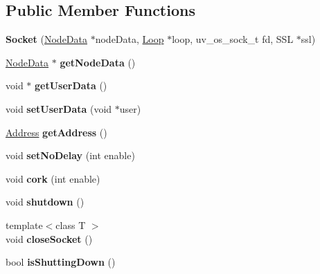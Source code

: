 \subsection*{Public Member Functions}
\begin{DoxyCompactItemize}
\item 
\mbox{\label{structu_s_1_1_socket_af0382e650ead4694c8114c4b0b56743b}} 
{\bfseries Socket} (\mbox{\hyperlink{structu_s_1_1_node_data}{Node\+Data}} $\ast$node\+Data, \mbox{\hyperlink{struct_loop}{Loop}} $\ast$loop, uv\+\_\+os\+\_\+sock\+\_\+t fd, S\+SL $\ast$ssl)
\item 
\mbox{\label{structu_s_1_1_socket_ae41d00dd8888a37bf235d6e4c4dd3bef}} 
\mbox{\hyperlink{structu_s_1_1_node_data}{Node\+Data}} $\ast$ {\bfseries get\+Node\+Data} ()
\item 
\mbox{\label{structu_s_1_1_socket_ab86ba43740c50f1a969917ee1105e55f}} 
void $\ast$ {\bfseries get\+User\+Data} ()
\item 
\mbox{\label{structu_s_1_1_socket_a81edd7ed05f455899a09711e37fb2f42}} 
void {\bfseries set\+User\+Data} (void $\ast$user)
\item 
\mbox{\label{structu_s_1_1_socket_af9f06bec0b50372e5df561ca47f7d6bf}} 
\mbox{\hyperlink{structu_s_1_1_socket_1_1_address}{Address}} {\bfseries get\+Address} ()
\item 
\mbox{\label{structu_s_1_1_socket_a0d1b35a546a5afe214adf71a74b6abbf}} 
void {\bfseries set\+No\+Delay} (int enable)
\item 
\mbox{\label{structu_s_1_1_socket_ab23d8de6bd87bdba787c2663390f1602}} 
void {\bfseries cork} (int enable)
\item 
\mbox{\label{structu_s_1_1_socket_aa377349b17a65d9968f20b076db65858}} 
void {\bfseries shutdown} ()
\item 
\mbox{\label{structu_s_1_1_socket_a241d2ac2268d3a9fa3084cca32d218de}} 
{\footnotesize template$<$class T $>$ }\\void {\bfseries close\+Socket} ()
\item 
\mbox{\label{structu_s_1_1_socket_a9cbd30c06deb03c91fdbbe434d761875}} 
bool {\bfseries is\+Shutting\+Down} ()
\end{DoxyCompactItemize}
